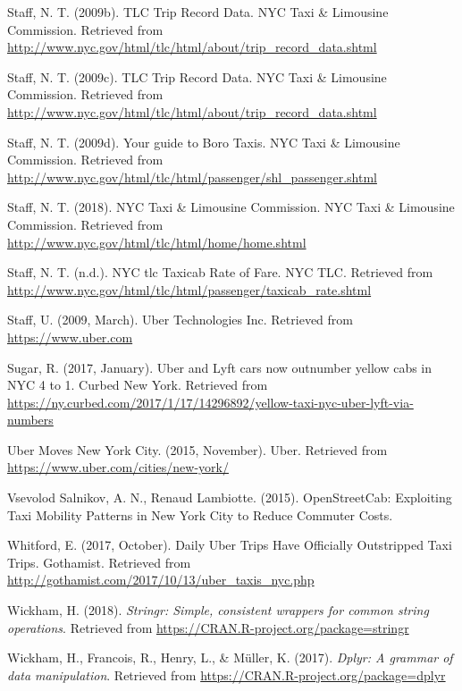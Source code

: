 \documentclass[12pt,twoside]{reedthesis}
\theoremstyle{definition}
\theoremstyle{definition}
\theoremstyle{definition}
\theoremstyle{remark}
\begin{document}
\hypertarget{ref-datayellow}{}
Staff, N. T. (2009b). TLC Trip Record Data. NYC Taxi \& Limousine
Commission. Retrieved from
\url{http://www.nyc.gov/html/tlc/html/about/trip_record_data.shtml}

\hypertarget{ref-datauber}{}
Staff, N. T. (2009c). TLC Trip Record Data. NYC Taxi \& Limousine
Commission. Retrieved from
\url{http://www.nyc.gov/html/tlc/html/about/trip_record_data.shtml}

\hypertarget{ref-greentaxi}{}
Staff, N. T. (2009d). Your guide to Boro Taxis. NYC Taxi \& Limousine
Commission. Retrieved from
\url{http://www.nyc.gov/html/tlc/html/passenger/shl_passenger.shtml}

\hypertarget{ref-nyctlc}{}
Staff, N. T. (2018). NYC Taxi \& Limousine Commission. NYC Taxi \&
Limousine Commission. Retrieved from
\url{http://www.nyc.gov/html/tlc/html/home/home.shtml}

\hypertarget{ref-tlcfarerate}{}
Staff, N. T. (n.d.). NYC tlc Taxicab Rate of Fare. NYC TLC. Retrieved
from \url{http://www.nyc.gov/html/tlc/html/passenger/taxicab_rate.shtml}

\hypertarget{ref-uberweb}{}
Staff, U. (2009, March). Uber Technologies Inc. Retrieved from
\url{https://www.uber.com}

\hypertarget{ref-sugar2017}{}
Sugar, R. (2017, January). Uber and Lyft cars now outnumber yellow cabs
in NYC 4 to 1. Curbed New York. Retrieved from
\url{https://ny.curbed.com/2017/1/17/14296892/yellow-taxi-nyc-uber-lyft-via-numbers}

\hypertarget{ref-ubernyc}{}
Uber Moves New York City. (2015, November). Uber. Retrieved from
\url{https://www.uber.com/cities/new-york/}

\hypertarget{ref-guerrini2015}{}
Vsevolod Salnikov, A. N., Renaud Lambiotte. (2015). OpenStreetCab:
Exploiting Taxi Mobility Patterns in New York City to Reduce Commuter
Costs.

\hypertarget{ref-emma2017}{}
Whitford, E. (2017, October). Daily Uber Trips Have Officially
Outstripped Taxi Trips. Gothamist. Retrieved from
\url{http://gothamist.com/2017/10/13/uber_taxis_nyc.php}

\hypertarget{ref-pkgstringr}{}
Wickham, H. (2018). \emph{Stringr: Simple, consistent wrappers for
common string operations}. Retrieved from
\url{https://CRAN.R-project.org/package=stringr}

\hypertarget{ref-pkgdplyr}{}
Wickham, H., Francois, R., Henry, L., \& Müller, K. (2017). \emph{Dplyr:
A grammar of data manipulation}. Retrieved from
\url{https://CRAN.R-project.org/package=dplyr}
\end{document}

